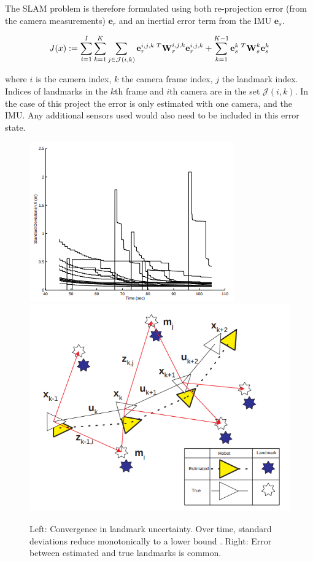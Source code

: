 \documentclass[a4paper,11pt,notitlepage]{article}
\begin{document}
The SLAM problem is therefore formulated using both re-projection error (from the camera measurements) $\textbf{e}_{r}$ and an inertial error term from the IMU $\textbf{e}_{s}$.  

\begin{equation}
\begin{aligned}
J(x) := \sum_{i=1}^{I} \sum_{k=1}^{K}\sum_{j \in \mathcal{J}(i,k)} \textbf{e}_{r}^{i,j,k \textnormal{ } T} \textbf{W}_{r}^{i,j,k} \textbf{e}_{r}^{i,j,k} + 
\sum_{k=1}^{K-1} \textbf{e}_{s}^{k \textnormal{ } T} \textbf{W}_{s}^{k} \textbf{e}_{s}^{k} 
\end{aligned}
\end{equation}

where $i$ is the camera index, $k$ the camera frame index, $j$ the landmark index. Indices of landmarks in the $k$th frame and $i$th camera are in the set $\mathcal{J}(i,k)$. In the case of this project the error is only estimated with one camera, and the IMU. Any additional sensors used would also need to be included in this error state. 


\noindent \begin{figure}[h!]
\includegraphics[width = 0.5\hsize]{figures/convergence_landmark_uncertainty.png}
\includegraphics[width = 0.5\hsize]{figures/ess_slam.png}
\caption{Left: Convergence in landmark uncertainty.  Over time, standard deviations reduce monotonically to a lower bound \cite{F_Durr_Pt1}. Right: Error between estimated and true landmarks is common.}
\label{slam_prob_fig}
\end{figure}
\end{document}
